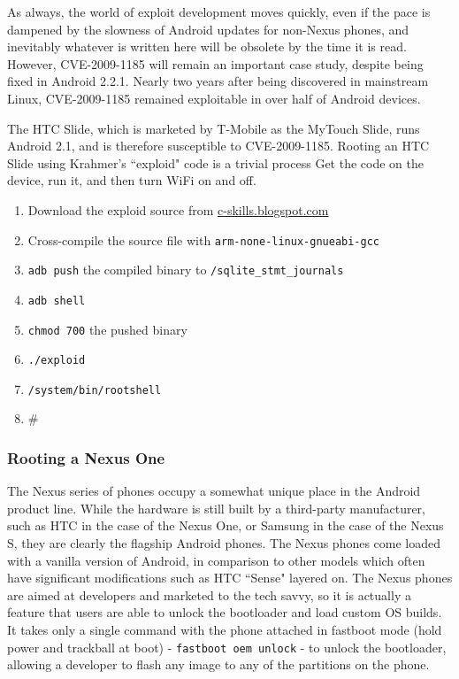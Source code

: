 As always, the world of exploit development moves quickly, even if the pace is dampened by the slowness of Android updates for non-Nexus phones, and inevitably whatever is written here will be obsolete by the time it is read. 
However, CVE-2009-1185 will remain an important case study, despite being fixed in Android 2.2.1.
Nearly two years after being discovered in mainstream Linux, CVE-2009-1185 remained exploitable in over half of Android devices.

The HTC Slide, which is marketed by T-Mobile as the MyTouch Slide, runs Android 2.1, and is therefore susceptible to CVE-2009-1185. 
Rooting an HTC Slide using Krahmer's ``exploid" code is a trivial process 
Get the code on the device, run it, and then turn WiFi on and off.

\begin{enumerate}
	\item Download the exploid source from \url{c-skills.blogspot.com}
	\item Cross-compile the source file with \texttt{arm-none-linux-gnueabi-gcc}
	\item \texttt{adb push} the compiled binary to \texttt{/sqlite\_stmt\_journals}
	\item \texttt{adb shell}
	\item \texttt{chmod 700} the pushed binary
	\item \texttt{./exploid}
	\item \texttt{/system/bin/rootshell}
	\item \#
\end{enumerate}

\subsubsection{Rooting a Nexus One}

The Nexus series of phones occupy a somewhat unique place in the Android product line.  While the hardware is still built by a
third-party manufacturer, such as HTC in the case of the Nexus One, or Samsung in the case of the Nexus S, they are clearly the
flagship Android phones.  The Nexus phones come loaded with a vanilla version of Android, in comparison to other models which often
have significant modifications such as HTC ``Sense" layered on.  The Nexus phones are aimed at developers and marketed to the tech
savvy, so it is actually a feature that users are able to unlock the bootloader and load custom OS builds.  It takes only a single
command with the phone attached in fastboot mode (hold power and trackball at boot) - \texttt{fastboot oem unlock} - to unlock the
bootloader, allowing a developer to flash any image to any of the partitions on the phone.

